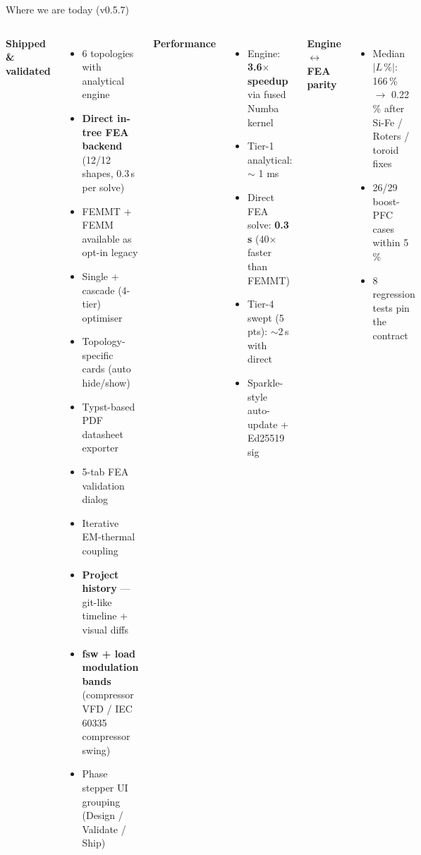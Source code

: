 \documentclass[11pt, aspectratio=169]{beamer}
\begin{document}
\begin{frame}{Where we are today (v0.5.7)}
  \begin{columns}[T,onlytextwidth]
    \textbf{Shipped \& validated}
    \begin{itemize}
      \item 6 topologies with analytical engine
      \item \textbf{Direct in-tree FEA backend}
            (12/12 shapes, 0.3\,s per solve)
      \item FEMMT + FEMM available as opt-in legacy
      \item Single + cascade (4-tier) optimiser
      \item Topology-specific cards (auto hide/show)
      \item Typst-based PDF datasheet exporter
      \item 5-tab FEA validation dialog
      \item Iterative EM-thermal coupling
      \item \textbf{Project history} --- git-like timeline +
            visual diffs
      \item \textbf{fsw + load modulation bands} (compressor
            VFD / IEC 60335 compressor swing)
      \item Phase stepper UI grouping (Design / Validate /
            Ship)
    \end{itemize}
    \textbf{Performance}
    \begin{itemize}
      \item Engine: \textbf{3.6$\times$ speedup} via fused
            Numba kernel
      \item Tier-1 analytical: $\sim$ 1 ms
      \item Direct FEA solve: \textbf{0.3 s} (40$\times$
            faster than FEMMT)
      \item Tier-4 swept (5 pts): $\sim$2\,s with direct
      \item Sparkle-style auto-update + Ed25519 sig
    \end{itemize}
    \textbf{Engine $\leftrightarrow$ FEA parity}
    \begin{itemize}
      \item Median $|L\,\%|$: 166\,\% $\rightarrow$
            0.22\,\% after Si-Fe / Roters / toroid fixes
      \item 26/29 boost-PFC cases within 5\,\%
      \item 8 regression tests pin the contract
    \end{itemize}
  \end{columns}
\end{frame}
\end{document}
